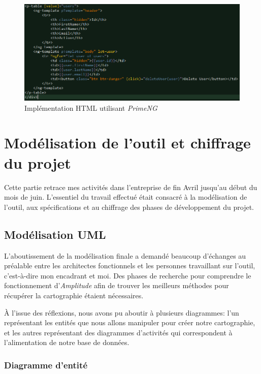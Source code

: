 \documentclass{polytech/polytech}
\begin{document}
\begin{figure}
	\includegraphics[scale=0.6]{images/primeng_html}
	\caption{Implémentation HTML utilisant \textit{PrimeNG}}
	\label{fig:primeNGHTML}
\end{figure}

\part{Modélisation de l'outil et chiffrage du projet}

Cette partie retrace mes activités dans l'entreprise de fin Avril jusqu'au début du mois de juin. L'essentiel du travail effectué était consacré à la modélisation de l'outil, aux spécifications et au chiffrage des phases de développement du projet.  

\chapter{Modélisation UML}

L'aboutissement de la modélisation finale a demandé beaucoup d'échanges au préalable entre les architectes fonctionnels et les personnes travaillant sur l'outil, c'est-à-dire mon encadrant et moi. Des phases de recherche pour comprendre le fonctionnement d'\textit{Amplitude} afin de trouver les meilleurs méthodes pour récupérer la cartographie étaient nécessaires. 

À l'issue des réflexions, nous avons pu aboutir à plusieurs diagrammes: l'un représentant les entités que nous allons manipuler pour créer notre cartographie, et les autres représentant des diagrammes d'activités qui correspondent à l'alimentation de notre base de données.


\section{Diagramme d'entité}
\end{document}
